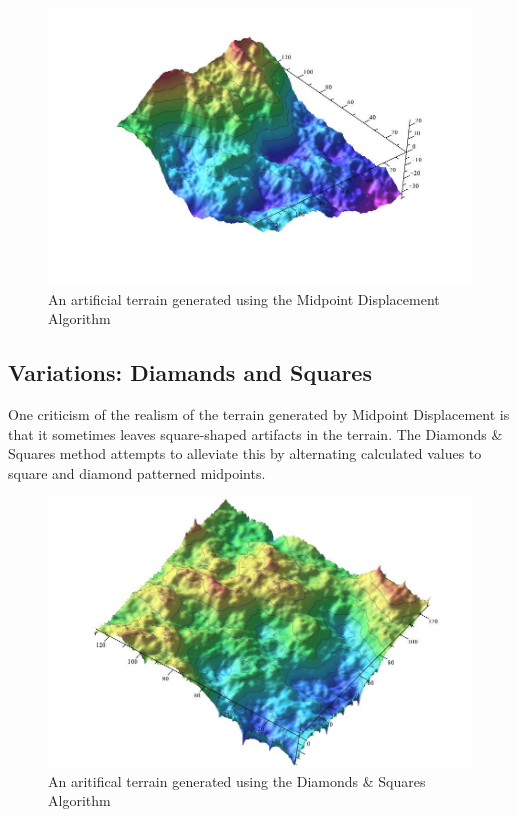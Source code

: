 \documentclass[11pt,twocolumn]{article}
\begin{document}
	\begin{figure}[ht]
	\includegraphics[scale=0.25]{midpoints.jpg}
	\caption{An artificial terrain generated using the Midpoint Displacement Algorithm}
	\label{fig:midpoint}
	\end{figure}

	\subsection{Variations: Diamands and Squares}
	One criticism of the realism of the terrain generated by Midpoint Displacement is that it sometimes
	leaves square-shaped artifacts in the terrain. The Diamonds \& Squares method attempts to alleviate this
	by alternating calculated values to square and diamond patterned midpoints.
	
	\begin{figure}[ht]
	\includegraphics[scale=0.25]{diamondsandsquares.jpg}
	\caption{An aritifical terrain generated using the Diamonds \& Squares Algorithm}
	\label{fig:DandS}
	\end{figure}
	
\end{document}
